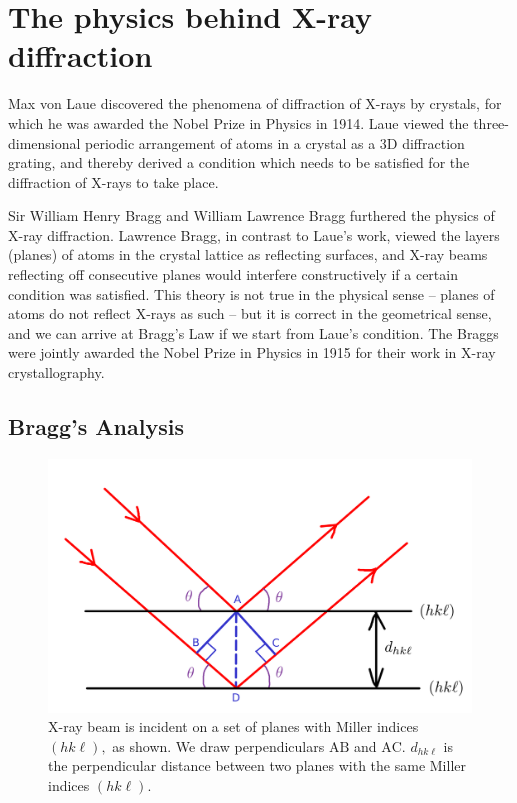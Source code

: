 \section{The physics behind X-ray diffraction}

Max von Laue discovered the phenomena of diffraction of X-rays by crystals, for which he was awarded the Nobel Prize in Physics in 1914. Laue viewed the three-dimensional periodic arrangement of atoms in a crystal as a 3D diffraction grating, and thereby derived a condition which needs to be satisfied for the diffraction of X-rays to take place.

Sir William Henry Bragg and William Lawrence Bragg furthered the physics of X-ray diffraction. Lawrence Bragg, in contrast to Laue's work, viewed the layers (planes) of atoms in the crystal lattice as reflecting surfaces, and X-ray beams reflecting off consecutive planes would interfere constructively if a certain condition was satisfied. This theory is not true in the physical sense -- planes of atoms do not reflect X-rays as such -- but it is correct in the geometrical sense, and we can arrive at Bragg's Law if we start from Laue's condition. The Braggs were jointly awarded the Nobel Prize in Physics in 1915 for their work in X-ray crystallography.

\subsection{Bragg's Analysis}
	
	\begin{figure}
	\centering
	\includegraphics[scale=0.15]{bragg_law.png}
	\caption{\label{fig:bragg_law}X-ray beam is incident on a set of planes with Miller indices $(hk\ell),$ as shown. We draw perpendiculars $\mathrm{AB}$ and $\mathrm{AC}$. $d_{hk\ell}$ is the perpendicular distance between two planes with the same Miller indices $(hk\ell).$}
	\end{figure}

